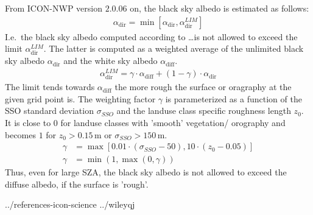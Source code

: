 \documentclass[a4paper,11pt]{article}
\begin{document}
From ICON-NWP version $2.0.06$ on, the black sky albedo is estimated as follows:
\begin{align}
 \alpha_{\mathrm{dir}} = \min\left[\alpha_{\mathrm{dir}},\alpha_{\mathrm{dir}}^{LIM}\right]
\end{align}
I.e.\ the black sky albedo computed according to \dots is not allowed to exceed the limit $\alpha_{\mathrm{dir}}^{LIM}$. 
The latter is computed as a weighted average of the unlimited black sky albedo $\alpha_{\mathrm{dir}}$ and the white sky albedo $\alpha_{\mathrm{diff}}$.
\begin{align}
 \alpha_{\mathrm{dir}}^{LIM} = \gamma \cdot \alpha_{\mathrm{diff}} + (1-\gamma)\cdot \alpha_{\mathrm{dir}}
\end{align}
The limit tends towards $\alpha_{\mathrm{diff}}$ the more rough the surface or oragraphy at the given grid point is. 
The weighting factor $\gamma$ is parameterized as a function of the SSO standard deviation $\sigma_{SSO}$ and 
the landuse class specific roughness length $z_{0}$. It is close to $0$ for landuse classes with 'smooth' vegetation/ orography 
and becomes $1$ for $z_{0}>0.15\,\mathrm{m}$ or $\sigma_{SSO}>150\,\mathrm{m}$.
\begin{align}
 \gamma &= \max\left[0.01\cdot (\sigma_{SSO}-50),10\cdot(z_{0}-0.05)\right]\\
 \gamma &= \min(1,\max(0,\gamma))
\end{align}
Thus, even for large SZA, the black sky albedo is not allowed to exceed the diffuse albedo, if the surface is 'rough'.



% 


 {../references-icon-science}
 {../wileyqj} %
\end{document}

